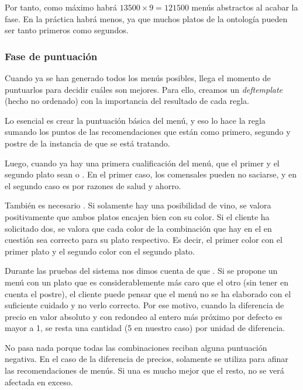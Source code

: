 Por tanto, como máximo habrá $13500 \times 9 = 121500$ menús abstractos al
acabar la fase. En la práctica habrá menos, ya que muchos platos de la
ontología pueden ser tanto primeros como segundos.

\subsubsection{Fase de puntuación}
Cuando ya se han generado todos los menús posibles, llega el momento de
puntuarlos para decidir cuáles son mejores. Para ello, creamos un
\emph{deftemplate} (hecho no ordenado)  con la importancia del
resultado de cada regla.

Lo esencial es crear la puntuación básica del menú, y eso lo hace la regla
 sumando los puntos de las recomendaciones que están
como primero, segundo y postre de la instancia de  que se
está tratando.

Luego, cuando ya hay una primera cualificación del menú,  que el primer y el segundo plato sean  o
. En el primer caso, los comensales pueden no saciarse, y en el
segundo caso es por razones de salud y ahorro. 

También es necesario . Si solamente hay una posibilidad de vino, se valora positivamente
que ambos platos encajen bien con su color. Si el cliente ha solicitado dos, se
valora que cada color de la combinación que hay en el  en
cuestión sea correcto para su plato respectivo. Es decir, el primer color con
el primer plato y el segundo color con el segundo plato.

Durante las pruebas del sistema nos dimos cuenta de que . Si se propone un menú con un plato
que es considerablemente más caro que el otro (sin tener en cuenta el postre),
el cliente puede pensar que el menú no se ha elaborado con el suficiente
cuidado y no verlo correcto. Por ese motivo, cuando la diferencia de precio en
valor absoluto y con redondeo al entero más próximo por defecto es mayor a 1,
se resta una cantidad (5 en nuestro caso) por unidad de diferencia.

No pasa nada porque todas las combinaciones reciban alguna puntuación
negativa. En el caso de la diferencia de precios, solamente se utiliza para
afinar las recomendaciones de menús. Si una es mucho mejor que el resto, no se
verá afectada en exceso.
